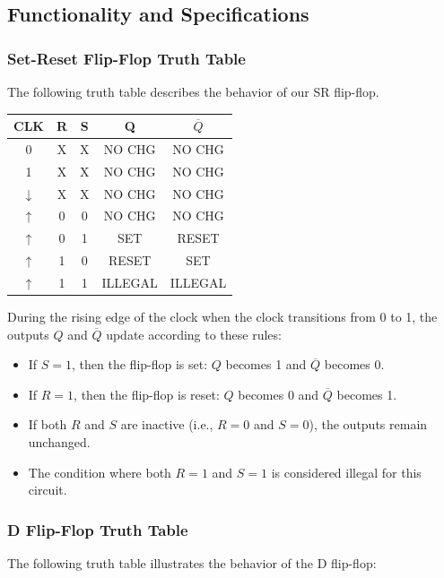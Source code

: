 \documentclass[12pt]{article}
\begin{document}
\subsection{Functionality and Specifications}
\subsubsection{Set-Reset Flip-Flop Truth Table}
The following truth table describes the behavior of our SR flip-flop.
\begin{center}
    \begin{tabular}{|c|c|c|c|c|}
        \hline
        CLK & R & S & Q & $\overline{Q}$ \\ 
        \hline
        0 & X & X & NO CHG & NO CHG \\ 
        1 & X & X & NO CHG & NO CHG \\ 
        $\downarrow$ & X & X & NO CHG & NO CHG \\ 
        $\uparrow$ & 0 & 0 & NO CHG & NO CHG \\ 
        $\uparrow$ & 0 & 1 & SET & RESET \\ 
        $\uparrow$ & 1 & 0 & RESET & SET \\ 
        $\uparrow$ & 1 & 1 & ILLEGAL & ILLEGAL \\ 
        \hline
    \end{tabular}
\end{center}
During the rising edge of the clock when the clock transitions from 0 to 1, the outputs \( Q \) and \( \overline{Q} \) update according to these rules:
\begin{itemize}
\item If \( S = 1 \), then the flip-flop is set: \( Q \) becomes 1 and \( \overline{Q} \) becomes 0.
\item If \( R = 1 \), then the flip-flop is reset: \( Q \) becomes 0 and \( \overline{Q} \) becomes 1.
\item If both \( R \) and \( S \) are inactive (i.e., \( R = 0 \) and \( S = 0 \)), the outputs remain unchanged. 
\item The condition where both \( R = 1 \) and \( S = 1 \) is considered illegal for this circuit.
\end{itemize}
\clearpage
\subsubsection{D Flip-Flop Truth Table}



The following truth table illustrates the behavior of the D flip-flop:
\end{document}
